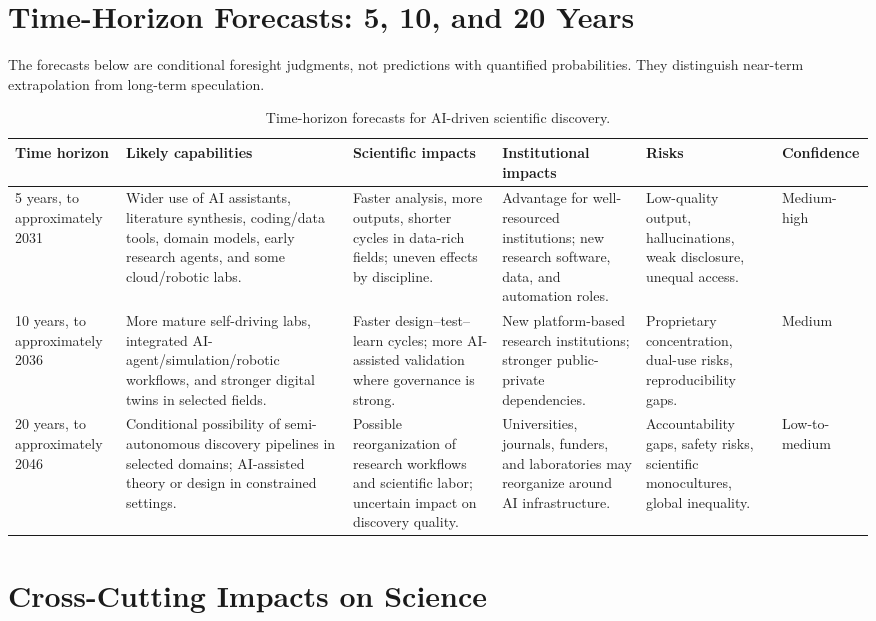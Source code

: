 \documentclass[12pt]{article}
\begin{document}
\section{Time-Horizon Forecasts: 5, 10, and 20 Years}

The forecasts below are conditional foresight judgments, not predictions with quantified probabilities. They distinguish near-term extrapolation from long-term speculation.

\begin{table}[H]
\centering
\caption{Time-horizon forecasts for AI-driven scientific discovery.}
\small
\begin{tabularx}{\textwidth}{p{2.2cm}X X X X p{2.0cm}}
\toprule
\textbf{Time horizon} & \textbf{Likely capabilities} & \textbf{Scientific impacts} & \textbf{Institutional impacts} & \textbf{Risks} & \textbf{Confidence} \\
\midrule
5 years, to approximately 2031 & Wider use of AI assistants, literature synthesis, coding/data tools, domain models, early research agents, and some cloud/robotic labs. & Faster analysis, more outputs, shorter cycles in data-rich fields; uneven effects by discipline. & Advantage for well-resourced institutions; new research software, data, and automation roles. & Low-quality output, hallucinations, weak disclosure, unequal access. & Medium-high \\
10 years, to approximately 2036 & More mature self-driving labs, integrated AI-agent/simulation/robotic workflows, and stronger digital twins in selected fields. & Faster design--test--learn cycles; more AI-assisted validation where governance is strong. & New platform-based research institutions; stronger public-private dependencies. & Proprietary concentration, dual-use risks, reproducibility gaps. & Medium \\
20 years, to approximately 2046 & Conditional possibility of semi-autonomous discovery pipelines in selected domains; AI-assisted theory or design in constrained settings. & Possible reorganization of research workflows and scientific labor; uncertain impact on discovery quality. & Universities, journals, funders, and laboratories may reorganize around AI infrastructure. & Accountability gaps, safety risks, scientific monocultures, global inequality. & Low-to-medium \\
\bottomrule
\end{tabularx}
\end{table}

\section{Cross-Cutting Impacts on Science}
\end{document}
